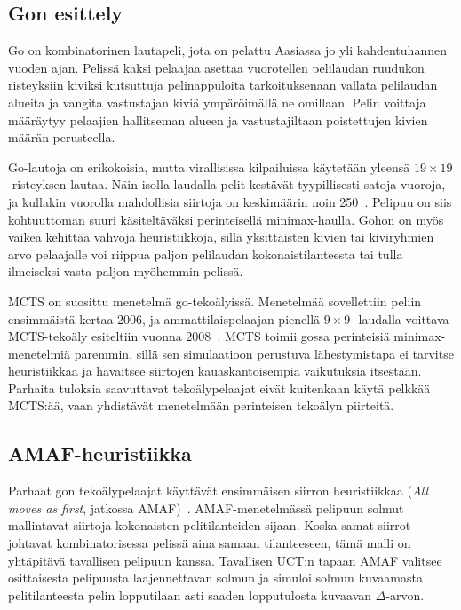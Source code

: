 \documentclass[12pt,finnish]{tktltiki2}
\theoremstyle{definition}
\theoremstyle{remark}
\begin{document}
\subsection{Gon esittely}

Go on kombinatorinen lautapeli, jota on pelattu Aasiassa jo yli kahdentuhannen vuoden ajan. Pelissä kaksi pelaajaa asettaa vuorotellen pelilaudan ruudukon risteyksiin kiviksi kutsuttuja pelinappuloita tarkoituksenaan vallata pelilaudan alueita ja vangita vastustajan kiviä ympäröimällä ne omillaan. Pelin voittaja määräytyy pelaajien hallitseman alueen ja vastustajiltaan poistettujen kivien määrän perusteella.

Go-lautoja on erikokoisia, mutta virallisissa kilpailuissa käytetään yleensä $19 \times 19$ -risteyksen lautaa. Näin isolla laudalla pelit kestävät tyypillisesti satoja vuoroja, ja kullakin vuorolla mahdollisia siirtoja on keskimäärin noin 250~\cite{browne}. Pelipuu on siis kohtuuttoman suuri käsiteltäväksi perinteisellä minimax-haulla. Gohon on myös vaikea kehittää vahvoja heuristiikkoja, sillä yksittäisten kivien tai kiviryhmien arvo pelaajalle voi riippua paljon pelilaudan kokonaistilanteesta tai tulla ilmeiseksi vasta paljon myöhemmin pelissä.

MCTS on suosittu menetelmä go-tekoälyissä. Menetelmää sovellettiin peliin ensimmäistä kertaa 2006, ja ammattilaispelaajan pienellä $9 \times 9$ -laudalla voittava MCTS-tekoäly esiteltiin vuonna 2008~\cite{browne}. MCTS toimii gossa perinteisiä minimax-menetelmiä paremmin, sillä sen simulaatioon perustuva lähestymistapa ei tarvitse heuristiikkaa ja havaitsee siirtojen kauaskantoisempia vaikutuksia itsestään. Parhaita tuloksia saavuttavat tekoälypelaajat eivät kuitenkaan käytä pelkkää MCTS:ää, vaan yhdistävät menetelmään perinteisen tekoälyn piirteitä.

\subsection{AMAF-heuristiikka}

Parhaat gon tekoälypelaajat käyttävät ensimmäisen siirron heuristiikkaa (\textit{All moves as first}, jatkossa AMAF)~\cite{browne}. AMAF-menetelmässä pelipuun solmut mallintavat siirtoja kokonaisten pelitilanteiden sijaan. Koska samat siirrot johtavat kombinatorisessa pelissä aina samaan tilanteeseen, tämä malli on yhtäpitävä tavallisen pelipuun kanssa. Tavallisen UCT:n tapaan AMAF valitsee osittaisesta pelipuusta laajennettavan solmun ja simuloi solmun kuvaamasta pelitilanteesta pelin lopputilaan asti saaden lopputulosta kuvaavan $\Delta$-arvon.
\end{document}
